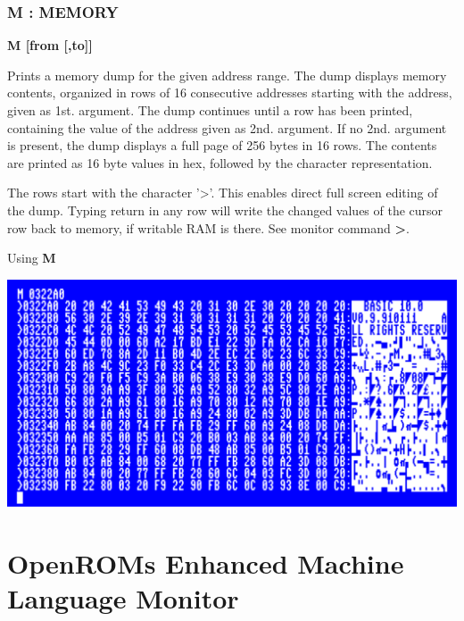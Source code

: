 
\subsubsection{M : MEMORY}
\begin{description}[leftmargin=2cm,style=nextline]
\item [Format:] {\bf M [from [,to]]}
\item [Usage:] Prints a memory dump for the given address range.
               The dump displays memory contents, organized in rows
               of 16 consecutive addresses starting with the
               address, given as 1st. argument. The dump continues
               until a row has been printed, containing the value
               of the address given as 2nd. argument.
               If no 2nd. argument is present, the dump displays
               a full page of 256 bytes in 16 rows.
               The contents are printed as 16 byte values in hex,
               followed by the character representation.

\item [Remarks:] The rows start with the character '>'.
                 This enables direct full screen editing of the dump.
                 Typing return in any row will write the changed
                 values of the cursor row back to memory, if writable RAM is there.
                 See monitor command {\bf >}.

\item [Example:] Using {\bf M}
\end{description}

\includegraphics[width=\linewidth]{images/monitor-m}

\section{OpenROMs Enhanced Machine Language Monitor}

